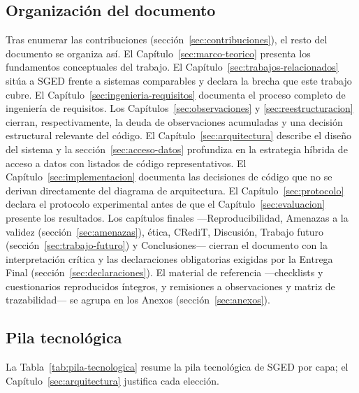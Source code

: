 \documentclass[11pt,a4paper]{article}
\begin{document}
\subsection{Organización del documento}

Tras enumerar las contribuciones (sección~\ref{sec:contribuciones}), el
resto del documento se organiza así. El
Capítulo~\ref{sec:marco-teorico} presenta los fundamentos conceptuales
del trabajo. El Capítulo~\ref{sec:trabajos-relacionados} sitúa a SGED
frente a sistemas comparables y declara la brecha que este trabajo cubre.
El Capítulo~\ref{sec:ingenieria-requisitos} documenta el proceso completo
de ingeniería de requisitos. Los Capítulos~\ref{sec:observaciones} y
\ref{sec:reestructuracion} cierran, respectivamente, la deuda de
observaciones acumuladas y una decisión estructural relevante del
código. El Capítulo~\ref{sec:arquitectura} describe el diseño del sistema
y la sección~\ref{sec:acceso-datos} profundiza en la estrategia híbrida
de acceso a datos con listados de código representativos. El
Capítulo~\ref{sec:implementacion} documenta las decisiones de código que
no se derivan directamente del diagrama de arquitectura. El
Capítulo~\ref{sec:protocolo} declara el protocolo experimental antes de
que el Capítulo~\ref{sec:evaluacion} presente los resultados. Los
capítulos finales —Reproducibilidad, Amenazas a la validez
(sección~\ref{sec:amenazas}), ética, CRediT, Discusión, Trabajo futuro
(sección~\ref{sec:trabajo-futuro}) y Conclusiones— cierran el documento
con la interpretación crítica y las declaraciones obligatorias exigidas
por la Entrega Final (sección~\ref{sec:declaraciones}). El material de
referencia —checklists y cuestionarios repro\-ducidos íntegros, y
remisiones a observaciones y matriz de trazabilidad— se agrupa en los
Anexos (sección~\ref{sec:anexos}).

\subsection{Pila tecnológica}

La Tabla~\ref{tab:pila-tecnologica} resume la pila tecnológica de SGED
por capa; el Capítulo~\ref{sec:arquitectura} justifica cada elección.
\end{document}

